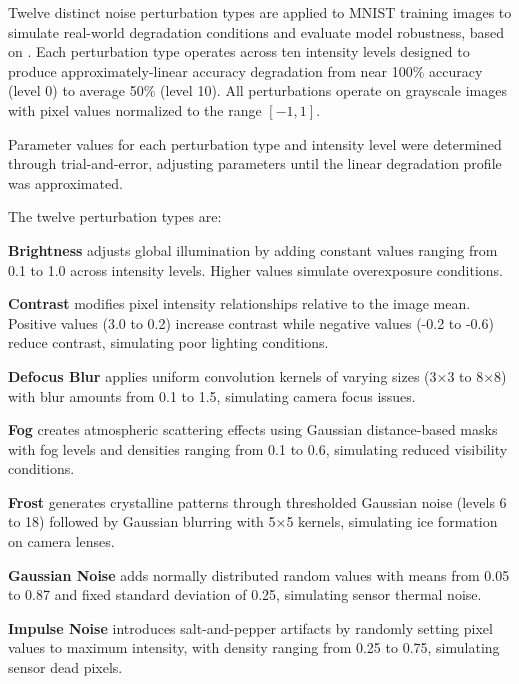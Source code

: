 
Twelve distinct noise perturbation types are applied to MNIST training images to simulate real-world degradation conditions and evaluate model robustness, based on \cite{hendrycks2019benchmarking}. Each perturbation type operates across ten intensity levels designed to produce approximately-linear accuracy degradation from near 100\% accuracy (level 0) to average 50\% (level 10). All perturbations operate on grayscale images with pixel values normalized to the range $[-1, 1]$.

Parameter values for each perturbation type and intensity level were determined through trial-and-error, adjusting parameters until the linear degradation profile was approximated.

The twelve perturbation types are:

\textbf{Brightness} adjusts global illumination by adding constant values ranging from 0.1 to 1.0 across intensity levels. Higher values simulate overexposure conditions.

\textbf{Contrast} modifies pixel intensity relationships relative to the image mean. Positive values (3.0 to 0.2) increase contrast while negative values (-0.2 to -0.6) reduce contrast, simulating poor lighting conditions.

\textbf{Defocus Blur} applies uniform convolution kernels of varying sizes (3×3 to 8×8) with blur amounts from 0.1 to 1.5, simulating camera focus issues.

\textbf{Fog} creates atmospheric scattering effects using Gaussian distance-based masks with fog levels and densities ranging from 0.1 to 0.6, simulating reduced visibility conditions.

\textbf{Frost} generates crystalline patterns through thresholded Gaussian noise (levels 6 to 18) followed by Gaussian blurring with 5×5 kernels, simulating ice formation on camera lenses.

\textbf{Gaussian Noise} adds normally distributed random values with means from 0.05 to 0.87 and fixed standard deviation of 0.25, simulating sensor thermal noise.

\textbf{Impulse Noise} introduces salt-and-pepper artifacts by randomly setting pixel values to maximum intensity, with density ranging from 0.25 to 0.75, simulating sensor dead pixels.

